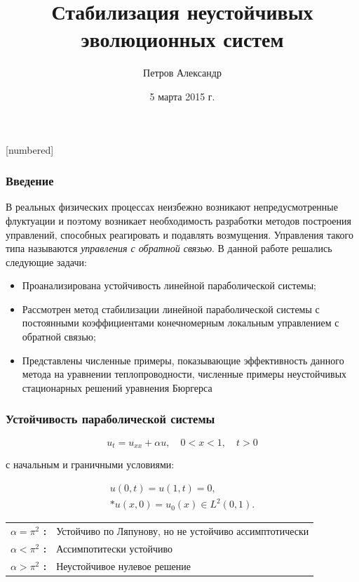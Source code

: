 \documentclass{beamer}
\title{Стабилизация неустойчивых эволюционных систем}
\author{Петров Александр}
\date{5 марта 2015 г.}
\begin{document}
[numbered]

\begin{frame}
\titlepage
\end{frame}


\begin{frame}
\frametitle{Введение}
\hspace{5mm} В реальных физических процессах неизбежно возникают непредусмотренные флуктуации и поэтому возникает необходимость разработки методов построения управлений, способных реагировать и подавлять возмущения. Управления такого типа называются \emph{управления с обратной связью}. В данной работе решались следующие задачи:
\begin{itemize}
	\item Проанализирована устойчивость линейной параболической системы;
	\item Рассмотрен метод стабилизации линейной параболической системы с постоянными коэффициентами конечномерным локальным управлением с обратной связью; 
	\item Представлены численные примеры, показывающие эффективность данного метода на уравнении теплопроводности, численные примеры неустойчивых стационарных решений уравнения Бюргерса
\end{itemize}
\end{frame}


\begin{frame}
\frametitle{Устойчивость параболической системы}

\begin{block}{}
\begin{equation}\label{dif_form}
u_t = u_{xx} + \alpha u, \quad 0 < x < 1, \quad t > 0
\end{equation}
\end{block}
с начальным и граничными условиями:
\begin{block}{}
\begin{gather}\label{d_control}
u(0, t) = u(1, t) = 0, \\*
u(x, 0) = u_{0}(x) \in L^2(0, 1). \nonumber
\end{gather}
\end{block}

\begin{tabular}{@{\textbullet~}l@{\ }p{3in}}
  \bfseries $\alpha = \pi^2$ : & Устойчиво по Ляпунову, но не устойчиво ассимптотически \\
  \bfseries $\alpha < \pi^2$ : & Ассимпотитески устойчиво \\
  \bfseries $\alpha > \pi^2$ : & Неустойчивое нулевое решение
\end{tabular}

\end{frame}
\end{document}
